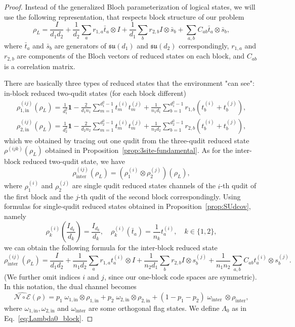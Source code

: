\documentclass[11pt,letterpaper]{article}
\theoremstyle{plain}
\theoremstyle{plain}
\theoremstyle{plain}
\theoremstyle{plain}
\theoremstyle{plain}
\theoremstyle{plain}
\theoremstyle{plain}
\theoremstyle{definition}
\theoremstyle{plain}
\begin{document}
\begin{proof}
Instead of the generalized Bloch parameterization of logical states, we will use the following representation, that respects block structure of our problem
\[
    \rho_L=\frac{I}{d_1 d_2}+\frac{1}{d_2} \sum_a r_{1, a} \bar{t}_a \otimes I+\frac{1}{d_1} \sum_b r_{2, b} I \otimes \bar{s}_b+\sum_{a, b} C_{a b} \bar{t}_a \otimes \bar{s}_b,
\]
where $\bar{t}_a$ and $\bar{s}_b$ are generators of $\mathfrak{su}(d_1)$ and $\mathfrak{su}(d_2)$ correspondingly, $r_{1, a}$ and $r_{2, b}$ are components of the Bloch vectors of reduced states on each block, and $C_{a b}$ is a correlation matrix.

There are basically three types of reduced states that the environment "can see": in-block reduced two-qudit states (for each block different)
\[
\begin{gathered}
    \rho_{1,\text {in }}^{(ij)}(\rho_L)=\frac{1}{d_1^2} \mathbf{1}-\frac{2}{d_1 n_1} \sum_{m=1}^{d_1^2-1} t_m^{(i)} t_m^{(j)}+\frac{1}{n_1 d_1} \sum_{b=1}^{d_1^2-1} r_{1, b}\left(t_b^{(i)}+t_b^{(j)}\right),\\
    \rho_{2,\text {in }}^{(ij)}(\rho_L)=\frac{1}{d_2^2} \mathbf{1}-\frac{2}{d_2 n_2} \sum_{m=1}^{d_2^2-1} t_m^{(i)} t_m^{(j)}+\frac{1}{n_2 d_2} \sum_{b=1}^{d_2^2-1} r_{2, b}\left(t_b^{(i)}+t_b^{(j)}\right),
\end{gathered}
\]
which we obtained by tracing out one qudit from the three-qudit reduced state $\rho^{(ijk)}(\rho_L)$ obtained in Proposition~\ref{prop:3site-fundamental}. As for the inter-block reduced two-qudit state, we have
\[
    \rho_{\text {inter }}^{(ij)}\left(\rho_L\right)=\left(\rho_1^{(i)} \otimes \rho_2^{(j)}\right)\left(\rho_L\right),
\]
where $\rho_1^{(i)}$ and $\rho_2^{(j)}$ are single qudit reduced states channels of the $i$-th qudit of the first block and the $j$-th qudit of the second block correspondingly. Using formulas for single-qudit reduced states obtained in Proposition~\ref{prop:SUdcov}, namely 
\[
    \rho_k^{(i)}\left(\frac{I_{d_k}}{d_k}\right)=\frac{I_{d_k}}{d_k}, \quad \rho_k^{(i)}\left(\bar{t}_a\right)=\frac{1}{n_k} t_a^{(i)}, \quad k\in\{1,2\},
\]
we can obtain the following formula for the inter-block reduced state
\[
    \rho_{\text {inter }}^{(ij)}(\rho_L)=\frac{I}{d_1 d_2}+\frac{1}{n_1 d_2} \sum_a r_{1, a} t_a^{(i)} \otimes I+\frac{1}{n_2 d_1} \sum_b r_{2, b} I \otimes s_b^{(j)}+\frac{1}{n_1 n_2} \sum_{a, b} C_{a b} t_a^{(i)} \otimes s_b^{(j)}.
\]
(We further omit indices $i$ and $j$, since our one-block code spaces are symmetric). In this notation, the dual channel becomes
\[
    \widehat{\mathcal{N} \circ \mathcal{E}}(\rho)=p_1\;\omega_{1, \text{in}}\otimes \rho_{1,\text{in}} + p_2\;\omega_{2, \text {in}}\otimes \rho_{2,\text{in}} + (1-p_1-p_2)\;\omega_{\text {inter }} \otimes \rho_{\text{inter}},
\]
where $\omega_{1, \text{in}}, \omega_{2, \text{in}}$ and $\omega_{\text{inter}}$ are some orthogonal flag states. We define $\Lambda_0$ as in Eq.~\eqref{eq:Lambda0_block}.


\end{proof}
\end{document}
